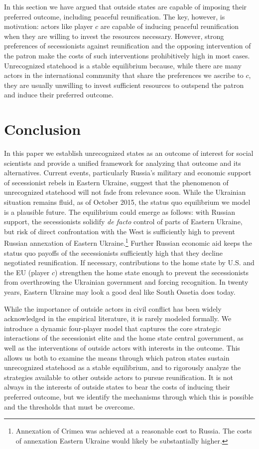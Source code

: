\documentclass[11pt,letterpaper, notitlepage]{article}
\begin{document}
In this section we have argued that outside states are capable of imposing their preferred outcome, including peaceful reunification. The key, however, is motivation: actors like player $c$ are capable of inducing peaceful reunification when they are willing to invest the resources necessary. However, strong preferences of secessionists against reunification and the opposing intervention of the patron make the costs of such interventions prohibitively high in most cases. Unrecognized statehood is a stable equilibrium because, while there are many actors in the international community that share the preferences we ascribe to $c$, they are usually unwilling to invest sufficient resources to outspend the patron and induce their preferred outcome.

\section{Conclusion}
In this paper we establish unrecognized states as an outcome of interest for social scientists and provide a unified framework for analyzing that outcome and its alternatives. Current events, particularly Russia's military and economic support of secessionist rebels in Eastern Ukraine, suggest that the phenomenon of unrecognized statehood will not fade from relevance soon. While the Ukrainian situation remains fluid, as of October 2015, the status quo equilibrium we model is a plausible future. The equilibrium could emerge as follows: with Russian support, the secessionists solidify \emph{de facto} control of parts of Eastern Ukraine, but risk of direct confrontation with the West is sufficiently high to prevent Russian annexation of Eastern Ukraine.\footnote{Annexation of Crimea was achieved at a reasonable cost to Russia. The costs of annexation Eastern Ukraine would likely be substantially higher.} Further Russian economic aid keeps the status quo payoffs of the secessionists sufficiently high that they decline negotiated reunification. If necessary, contributions to the home state by U.S. and the EU (player $c$) strengthen the home state enough to prevent the secessionists from overthrowing the Ukrainian government and forcing recognition. In twenty years, Eastern Ukraine may look a good deal like South Ossetia does today. 

While the importance of outside actors in civil conflict has been widely acknowledged in the empirical literature, it is rarely modeled formally. We introduce a dynamic four-player model that captures the core strategic interactions of the secessionist elite and the home state central government, as well as the interventions of outside actors with interests in the outcome. This allows us both to examine the means through which patron states sustain unrecognized statehood as a stable equilibrium, and to rigorously analyze the strategies available to other outside actors to pursue reunification. It is not always in the interests of outside states to bear the costs of inducing their preferred outcome, but we identify the mechanisms through which this is possible and the thresholds that must be overcome.
\end{document}
